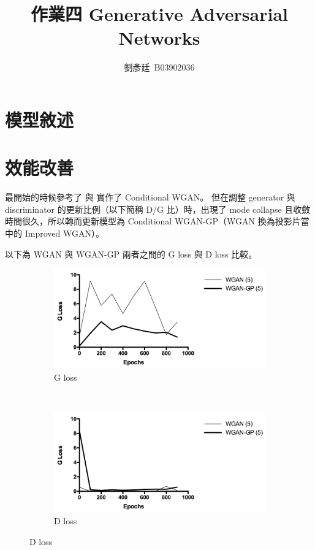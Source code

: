 \documentclass[final,3p]{elsarticle}
\begin{document}
\begin{frontmatter}

\title{作業四 Generative Adversarial Networks}

\author{劉彥廷~B03902036}

\end{frontmatter}


\section{模型敘述}

\section{效能改善}
	最開始的時候參考了 \cite{jiamings91:online} 與 \cite{zhangqia0:online} 實作了 Conditional WGAN。
	但在調整 generator 與 discriminator 的更新比例（以下簡稱 D/G 比）時，出現了 mode collapse 且收斂時間很久，所以轉而更新模型為 Conditional WGAN-GP（WGAN 換為投影片當中的 Improved WGAN）。
	
	以下為 WGAN 與 WGAN-GP 兩者之間的 G loss 與 D loss 比較。
	\begin{figure}[H]
		\centering
		\begin{subfigure}{.48\textwidth}
			\centering
			\includegraphics[width=\linewidth]{images/g_loss_wgangp}
			\caption{G loss}
		\end{subfigure}
		~
		\begin{subfigure}{.48\textwidth}
			\centering
			\includegraphics[width=\linewidth]{images/d_loss_wgangp}
			\caption{D loss}
		\end{subfigure}
		\label{fig:dg_gd_loss}
	\end{figure}
\end{document}
